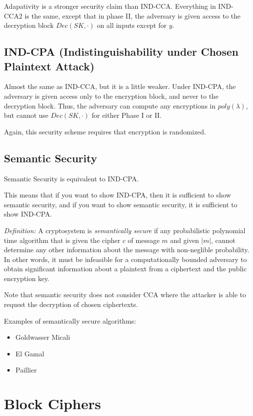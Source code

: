 \documentclass[psamsfonts]{amsart}
\begin{document}
Adapativity is a stronger security claim than IND-CCA. Everything in IND-CCA2 is the same, except that in phase II, the adversary is given access to the decryption block $Dec(SK, \cdot)$ on all inputs except for $y$.

\subsection{IND-CPA (Indistinguishability under Chosen Plaintext Attack)}

Almost the same as IND-CCA, but it is a little weaker. Under IND-CPA, the adversary is given access only to the encryption block, and never to the decryption block. Thus, the adversary can compute any encryptions in $poly(\lambda)$, but cannot use $Dec(SK, \cdot)$ for either Phase I or II.

Again, this security scheme requires that encryption is randomized.

\subsection{Semantic Security}

Semantic Security is equivalent to IND-CPA.

This means that if you want to show IND-CPA, then it is sufficient to show semantic security, and if you want to show semantic security, it is sufficient to show IND-CPA.

\emph{Definition:} A cryptosystem is \emph{semantically secure} if any probabilistic polynomial time algorithm that is given the cipher $c$ of message $m$ and given $|m|$, cannot determine any other information about the message with non-neglible probability. In other words, it must be infeasible for a computationally bounded adversary to obtain significant information about a plaintext from a ciphertext and the public encryption key.

Note that semantic security does not consider CCA where the attacker is able to request the decryption of chosen ciphertexts.

Examples of semantically secure algorithms:
\begin{itemize}
  \item Goldwasser Micali
  \item El Gamal
  \item Paillier
\end{itemize}

\newpage

\section{Block Ciphers}
\end{document}
